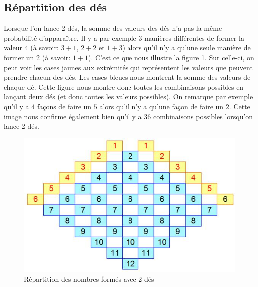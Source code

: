\documentclass[letterpaper]{article}
\begin{document}
  \subsection{Répartition des dés}
    \label{repart_des}
    Lorsque l'on lance 2 dés, la somme des valeurs des dés n'a pas la même probabilité
    d'apparaître.  Il y a par exemple 3 manières différentes de former la valeur 4 (à 
    savoir: $3+1$, $2+2$ et $1+3$) alors qu'il n'y a qu'une seule manière de former 
    un 2 (à savoir: $1+1$).
    C'est ce que nous illustre la figure \ref{tableau_repartition_des}.  Sur celle-ci,
    on peut voir les cases jaunes aux extrémités qui représentent les valeurs que 
    peuvent prendre chacun des dés.  Les cases bleues nous montrent la somme des valeurs
    de chaque dé.  Cette figure nous montre donc toutes les combinaisons possibles en
    lançant deux dés (et donc toutes les valeurs possibles).  On remarque par exemple
    qu'il y a 4 façons de faire un $5$ alors qu'il n'y a qu'une façon de faire un $2$.
    Cette image nous confirme également bien qu'il y a 36 combinaisons possibles 
    lorsqu'on lance 2 dés.
    \begin{figure}[h]
      \centering
      \includegraphics[scale=0.4]{./Images/RepartitionDes.jpg}
	\caption{Répartition des nombres formés avec 2 dés \citep{IMG_Des}}
      \label{tableau_repartition_des}
    \end{figure}
    
\end{document}
